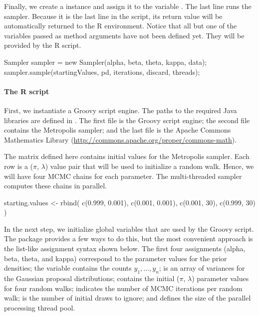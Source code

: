 Finally, we create a  instance and assign it to the variable . The last line runs the sampler. Because it is the last line in the script, its return value will be automatically returned to the R environment. Notice that all but one of the variables passed as method arguments have not been defined yet. They will be provided by the R script.
\begin{example}
Sampler sampler = new Sampler(alpha, beta, theta, kappa, data);
sampler.sample(startingValues, pd, iterations, discard, threads);
\end{example}

\paragraph{The R script} First, we instantiate a Groovy script engine. The paths to the required Java libraries are defined in . The first file is the Groovy script engine; the second file contains the Metropolis sampler; and the last file is the Apache Commons Mathematics Library (\url{http://commons.apache.org/proper/commons-math}).

The matrix  defined here contains initial values for the Metropolis sampler. Each row is a ($\pi$, $\lambda$) value pair that will be used to initialize a random walk. Hence, we will have four MCMC chains for each parameter. The multi-threaded sampler computes these chains in parallel.

\begin{example}
starting.values <- rbind(
  c(0.999, 0.001),
  c(0.001, 0.001),
  c(0.001, 30),
  c(0.999, 30)
)
\end{example}

In the next step, we initialize global variables that are used by the Groovy script. The  package provides a few ways to do this, but the most convenient approach is the list-like assignment syntax shown below. The first four assignments (alpha, beta, theta, and kappa) correspond to the parameter values for the prior densities; the variable  contains the counts $y_1,\dots,y_n$;  is an array of variances for the Gaussian proposal distributions;  contains the initial ($\pi$, $\lambda$) parameter values for four random walks;  indicates the number of MCMC iterations per random walk;  is the number of initial draws to ignore; and  defines the size of the parallel processing thread pool.

